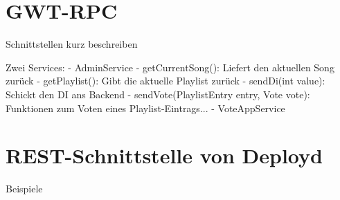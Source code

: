 \section{GWT-RPC}

Schnittstellen kurz beschreiben

Zwei Services:
- AdminService
	- getCurrentSong(): Liefert den aktuellen Song zurück
	- getPlaylist(): Gibt die aktuelle Playlist zurück
	- sendDi(int value): Schickt den DI ans Backend
	- sendVote(PlaylistEntry entry, Vote vote): Funktionen zum Voten eines Playlist-Eintrags...
- VoteAppService

\section{REST-Schnittstelle von Deployd}

Beispiele